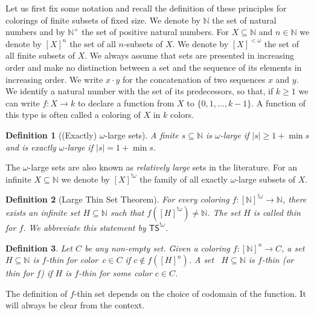 \documentclass[10pt,a4paper]{article}
\newcommand{\TS}[0]{\mathsf{TS}}
\newcommand{\NN}[0]{\mathbb{N}}
\newtheorem{theorem}{Theorem}
\numberwithin{theorem}{section}
\newtheorem{definition}[theorem]{Definition}
\begin{document}
Let us first fix some notation and recall the definition of these principles for colorings of finite subsets of fixed size. We denote by $\NN$ the set of natural numbers and by $\NN^+$ the set of positive natural numbers. For $X\subseteq \NN$ and $n \in \NN$
we denote by $[X]^{n}$ the set of all $n$-subsets of $X$. We denote by $[X]^{<\omega}$ the set of all finite subsets of $X$. We always assume that sets are presented in increasing order and make no distinction between a set and the sequence of its elements in increasing order. We write $x \cdot y$ for the concatenation of two sequences $x$ and $y$. We identify a natural number with the set of its predecessors, so that, if $k\geq 1$ we can write $f: X \to k$ to declare a function from $X$ to $\{0, 1, \dots, k-1\}$. A function of this type is often called a coloring of $X$ in $k$ colors.

\begin{definition}[(Exactly) $\omega$-large sets] 
A finite $s\subseteq \NN$ is $\omega$-large if $|s| \geq 1+\min s$ and is exactly $\omega$-large if $|s| = 1+\min s$.
\end{definition}

The $\omega$-large sets are also known as {\em relatively large} sets in the literature. For an infinite $X\subseteq \NN$ we denote by $[X]^{!\omega}$ the family of all exactly $\omega$-large subsets of $X$.

\begin{definition}[Large Thin Set Theorem]\label{thm:thin}
For every coloring $f:[\NN]^{!\omega} \to \NN$, there exists an infinite set $H\subseteq \NN$ such that $f([H]^{!\omega}) \neq \NN$. The set $H$ is called \emph{thin} for $f$. We abbreviate this statement by $\TS^{!\omega}$.
\end{definition}

\begin{definition}
Let $C$ be any non-empty set. Given a coloring $f : [\NN]^n \to C$, a set~$H \subseteq \NN$ is \emph{$f$-thin for color~$c \in C$} if $c \not \in f([H]^n)$. A set ~$H \subseteq \NN$ is $f$-thin (or thin for $f$) if $H$ is $f$-thin for some color $c\in C$.
\end{definition}

The definition of $f$-thin set depends on the choice of codomain of the function. It will always be clear from the context. 

\end{document}
